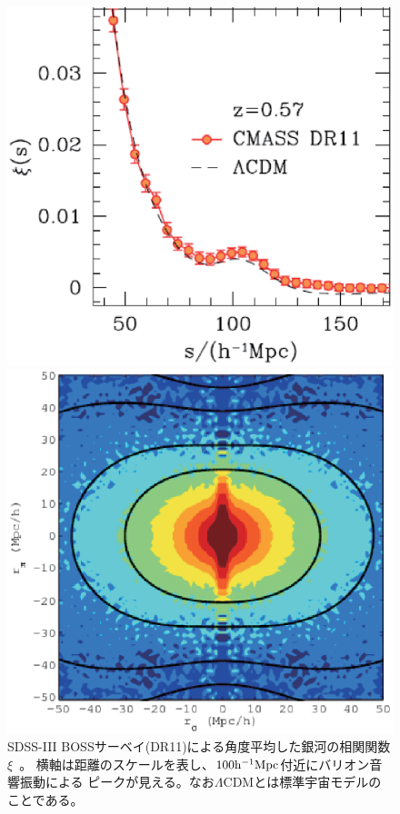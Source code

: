 \begin{figure}[t]
 \begin{minipage}{0.5\hsize}
 \begin{center}
   \includegraphics[width=0.95\linewidth]{cosmology/SDSS_BOSS_DR11_BAO.eps}   
   \caption{SDSS-III BOSSサーベイ(DR11)による角度平均した銀河の相関関数$\xi$~\citep{Sanchez:2013tga}。
            横軸は距離のスケールを表し、$100{\rm h}^{-1}{\rm Mpc}$付近にバリオン音響振動による
            ピークが見える。なお$\Lambda$CDMとは標準宇宙モデルのことである。}\label{fig:BOSS_BAO}
 \end{center}
 \end{minipage}
 \hspace{5pt}
 \begin{minipage}{0.5\hsize}
 \begin{center}\vspace{-10pt}
   \includegraphics[width=0.95\linewidth]{cosmology/butterfly_colour_smallerscales.eps} 

\end{center}
\end{minipage}
\end{figure}
